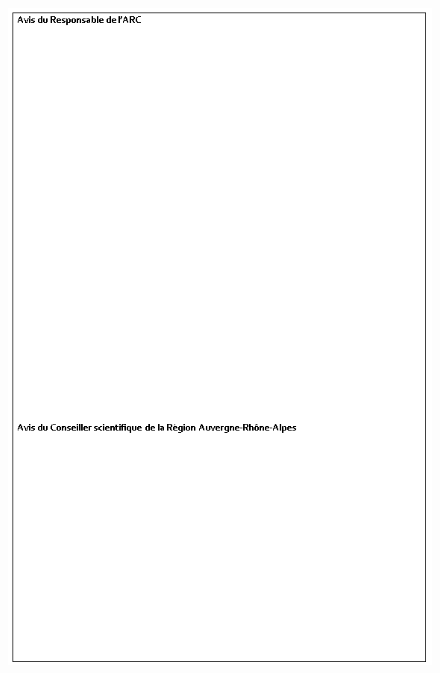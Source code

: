 \documentclass[11pt,a4paper,oneside]{report}
\begin{document}
\newpage
\begin{figure}
\center
\includegraphics[scale=1]{avis.png}
\end{figure}




\end{document}
